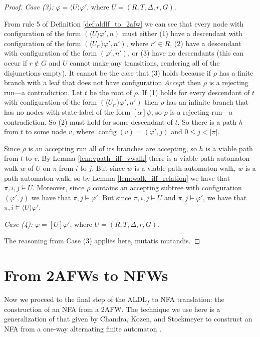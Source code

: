 \documentclass{lmcs}
\theoremstyle{definition}
\newcommand{\dbox}[1]{\langle #1 \rangle}
\newcommand{\bbox}[1]{[ #1 ]}
\DeclareMathOperator{\config}{config}
\DeclareMathOperator{\?}{?}
\begin{document}
\begin{proof}
    \textit{Case (3):} $\varphi = \dbox{U}\varphi'$, where $U = (R,T,\Delta,r,G)$.

    From rule 5 of Definition \ref{def:aldlf_to_2afw} we can see that every node with configuration of the form $(\dbox{U}\varphi',n)$
    must either (1) have a descendant with configuration of the form $(\dbox{U_{r'}}\varphi',n')$, where $r' \in R$, (2) have a descendant with
    configuration of the form $(\varphi',n')$, or (3) have no descendants (this can occur if $r \not\in G$ and $U$ cannot make
    any transitions, rendering all of the disjunctions empty). It cannot be the case that (3) holds because if $\rho$ has a finite
    branch with a leaf that does not have configuration $Accept$ then $\rho$ is a rejecting run---a contradiction. Let $t$ be the root
    of $\rho$. If (1) holds for every descendant of $t$ with configuration of the form $(\dbox{U_{r'}}\varphi',n')$ then
    $\rho$ has an infinite branch that has no nodes with state-label of the form $\bbox{\alpha}\psi$, so $\rho$ is a rejecting run---a contradiction.
    So (2) must hold for some descendant of $t$. So there is a path $h$ from $t$ to some node $v$,
    where $\config(v) = (\varphi',j)$ and $0 \leq j < |\pi|$.

    Since $\rho$ is an accepting run all of its branches are accepting, so $h$ is a viable path from $t$ to $v$.
    By Lemma \ref{lem:vpath_iff_vwalk} there is a viable path automaton walk $w$ of $U$ on $\pi$ from $i$ to $j$. But since $w$ is a viable
    path automaton walk, $w$ is a path automaton walk, so by Lemma \ref{lem:walk_iff_relation} we have that $\pi,i,j \models U$.
    Moreover, since $\rho$ contains an accepting subtree with configuration $(\varphi',j)$ we have that $\pi,j \models \varphi'$.
    But since $\pi,i,j \models U$ and $\pi,j \models \varphi'$, we have that $\pi,i \models \dbox{U}\varphi'$.

    \textit{Case (4):} $\varphi = \bbox{U}\varphi'$, where $U = (R,T,\Delta,r,G)$.

    The reasoning from Case (3) applies here, mutatis mutandis.
\end{proof}


\section{From 2AFWs to NFWs}
\label{ch:2afwtonfw}

Now we proceed to the final step of the ALDL$_f$ to NFA translation: the construction of an NFA from a 2AFW. The technique we use here is a generalization of that given by Chandra, Kozen, and Stockmeyer to construct an NFA from a one-way alternating finite automaton \cite{chandra}.
\end{document}
